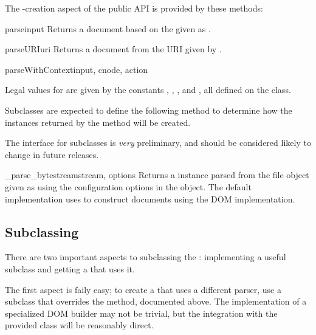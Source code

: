 \documentclass{howto}
\begin{document}
The -creation aspect of the public API is provided by
these methods:

\begin{methoddesc}[DOMBuilder]{parse}{input}
  Returns a document based on the  given as
  .
\end{methoddesc}

\begin{methoddesc}[DOMBuilder]{parseURI}{uri}
  Returns a document from the URI given by .
\end{methoddesc}

\begin{methoddesc}[DOMBuilder]{parseWithContext}{input, cnode, action}

  Legal values for  are given by the constants
  , ,
  , and ,
  all defined on the  class.
\end{methoddesc}

Subclasses are expected to define the following method to determine
how the  instances returned by the 
method will be created.

\begin{notice}[warning]
  The interface for subclasses is \emph{very} preliminary, and should
  be considered likely to change in future releases.
\end{notice}

\begin{methoddesc}[DOMBuilder]{_parse_bytestream}{stream, options}
  Returns a  instance parsed from the file object
  given as  using the configuration options in the
   object.  The default implementation  uses
   to construct documents using the
   DOM implementation.
\end{methoddesc}

\subsection{Subclassing }

There are two important aspects to subclassing the :
implementing a useful subclass and getting a 
that uses it.

The first aspect is faily easy; to create a  that
uses a different parser, use a subclass that overrides the
 method, documented above.  The
implementation of a specialized DOM builder may not be trivial, but
the integration with the provided  class will be
reasonably direct.
\end{document}
